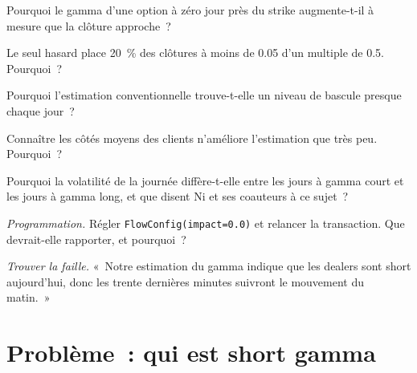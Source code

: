 \begin{exercise}[$\star$]\label{exo:s2:zero-day-options-and-dealer-gamma-flows:2}
Pourquoi le gamma d'une option à zéro jour près du strike augmente-t-il à mesure que la clôture approche~?
\end{exercise}

\begin{exercise}[$\star$]\label{exo:s2:zero-day-options-and-dealer-gamma-flows:3}
Le seul hasard place 20~\% des clôtures à moins de 0.05 d'un multiple de 0.5. Pourquoi~?
\end{exercise}

\begin{exercise}[$\star\star$]\label{exo:s2:zero-day-options-and-dealer-gamma-flows:4}
Pourquoi l'estimation conventionnelle trouve-t-elle un niveau de bascule presque chaque jour~?
\end{exercise}

\begin{exercise}[$\star\star$]\label{exo:s2:zero-day-options-and-dealer-gamma-flows:5}
Connaître les côtés moyens des clients n'améliore l'estimation que très peu. Pourquoi~?
\end{exercise}

\begin{exercise}[$\star\star$]\label{exo:s2:zero-day-options-and-dealer-gamma-flows:6}
Pourquoi la volatilité de la journée diffère-t-elle entre les jours à gamma court et les jours à gamma long, et que disent Ni et ses coauteurs à ce sujet~?
\end{exercise}

\begin{exercise}[$\star\star\star$]\label{exo:s2:zero-day-options-and-dealer-gamma-flows:7}
\emph{Programmation.} Régler \texttt{FlowConfig(impact=0.0)} et relancer la transaction. Que devrait-elle rapporter, et pourquoi~?
\end{exercise}

\begin{exercise}[$\star\star\star$]\label{exo:s2:zero-day-options-and-dealer-gamma-flows:8}
\emph{Trouver la faille.} «~Notre estimation du gamma indique que les dealers sont short aujourd'hui, donc les trente dernières minutes suivront le mouvement du matin.~»
\end{exercise}

\section{Problème~: qui est short gamma}

